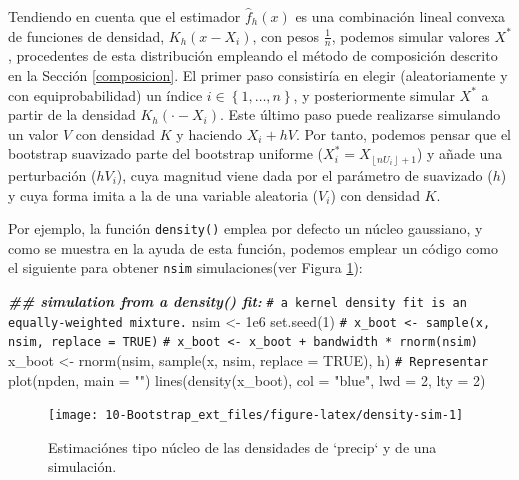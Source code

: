 \documentclass[
  10pt,
]{book}
\newenvironment{Shaded}{\begin{snugshade}}{\end{snugshade}}
\newcommand{\AttributeTok}[1]{\textcolor[rgb]{0.77,0.63,0.00}{#1}}
\newcommand{\CommentTok}[1]{\textcolor[rgb]{0.56,0.35,0.01}{\textit{#1}}}
\newcommand{\ConstantTok}[1]{\textcolor[rgb]{0.00,0.00,0.00}{#1}}
\newcommand{\DecValTok}[1]{\textcolor[rgb]{0.00,0.00,0.81}{#1}}
\newcommand{\DocumentationTok}[1]{\textcolor[rgb]{0.56,0.35,0.01}{\textbf{\textit{#1}}}}
\newcommand{\FloatTok}[1]{\textcolor[rgb]{0.00,0.00,0.81}{#1}}
\newcommand{\FunctionTok}[1]{\textcolor[rgb]{0.00,0.00,0.00}{#1}}
\newcommand{\NormalTok}[1]{#1}
\newcommand{\OtherTok}[1]{\textcolor[rgb]{0.56,0.35,0.01}{#1}}
\newcommand{\StringTok}[1]{\textcolor[rgb]{0.31,0.60,0.02}{#1}}
\theoremstyle{break}
\theoremstyle{nonumberplain}
\renewcommand{\CommentTok}[1]{\textcolor[rgb]{0.41,0.41,0.41}{\texttt{#1}}}
\begin{document}
Tendiendo en cuenta que el estimador \(\hat{f}_{h}\left( x \right)\) es una combinación lineal convexa de funciones de densidad, \(K_{h}\left(x-X_i \right)\), con pesos \(\frac{1}{n}\), podemos simular valores \(X^{\ast}\), procedentes de esta distribución empleando el método de composición descrito en la Sección \ref{composicion}.
El primer paso consistiría en elegir (aleatoriamente y con equiprobabilidad) un índice \(i\in \left\{ 1,\ldots ,n\right\}\), y posteriormente simular \(X^{\ast}\) a partir de la densidad \(K_{h}\left(\cdot -X_i \right)\).
Este último paso puede realizarse simulando un valor \(V\) con densidad \(K\) y haciendo \(X_i+hV\).
Por tanto, podemos pensar que el bootstrap suavizado parte del bootstrap uniforme (\(X_i^{\ast}=X_{\left\lfloor nU_i\right\rfloor +1}\)) y añade una perturbación (\(hV_i\)), cuya magnitud viene dada por el parámetro de suavizado (\(h\)) y cuya forma imita a la de una variable aleatoria (\(V_i\)) con densidad \(K\).

Por ejemplo, la función \texttt{density()} emplea por defecto un núcleo gaussiano, y como se muestra en la ayuda de esta función, podemos emplear un código como el siguiente para obtener \texttt{nsim} simulaciones(ver Figura \ref{fig:density-sim}):

\begin{Shaded}
\begin{Highlighting}[]
\DocumentationTok{\#\# simulation from a density() fit:}
\CommentTok{\# a kernel density fit is an equally{-}weighted mixture.}
\NormalTok{nsim }\OtherTok{\textless{}{-}} \FloatTok{1e6}
\FunctionTok{set.seed}\NormalTok{(}\DecValTok{1}\NormalTok{)}
\CommentTok{\# x\_boot \textless{}{-} sample(x, nsim, replace = TRUE)}
\CommentTok{\# x\_boot \textless{}{-} x\_boot + bandwidth * rnorm(nsim)}
\NormalTok{x\_boot }\OtherTok{\textless{}{-}} \FunctionTok{rnorm}\NormalTok{(nsim, }\FunctionTok{sample}\NormalTok{(x, nsim, }\AttributeTok{replace =} \ConstantTok{TRUE}\NormalTok{), h)}
\CommentTok{\# Representar}
\FunctionTok{plot}\NormalTok{(npden, }\AttributeTok{main =} \StringTok{""}\NormalTok{)}
\FunctionTok{lines}\NormalTok{(}\FunctionTok{density}\NormalTok{(x\_boot), }\AttributeTok{col =} \StringTok{"blue"}\NormalTok{, }\AttributeTok{lwd =} \DecValTok{2}\NormalTok{, }\AttributeTok{lty =} \DecValTok{2}\NormalTok{)}
\end{Highlighting}
\end{Shaded}

\begin{figure}[!htbp]

{\centering \texttt{[image: 10-Bootstrap\_ext\_files/figure-latex/density-sim-1]} 

}

\caption{Estimaciónes tipo núcleo de las densidades de `precip` y de una simulación.}\label{fig:density-sim}
\end{figure}
\end{document}
